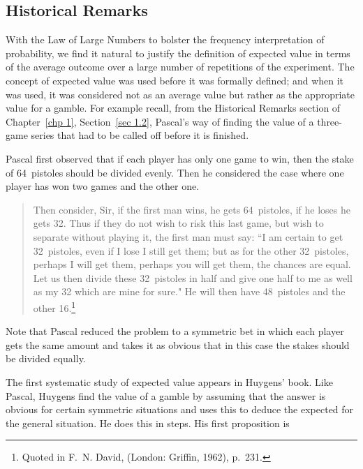 \subsection*{Historical Remarks}

With the Law of Large Numbers to bolster the frequency interpretation of probability, 
we find it natural to justify the definition of expected value in terms of the average
outcome over a large number of repetitions of the experiment.  The concept of expected
value was used before it was formally defined; and when it was used, it was considered
not as an average value but rather as the appropriate value for a gamble.  For example
recall, from the Historical Remarks section of Chapter~\ref{chp 1}, Section~\ref{sec 1.2}, Pascal's way of finding the value of a three-game series that had to be called
off before it is finished.
\par
Pascal first observed that if each player has only one game to win, then the
stake of 64~pistoles should be divided evenly.  Then he considered the case where one
player has won two games and the other one.

\begin{quote} Then consider, Sir, if the first man wins, he gets 64~pistoles, if he
loses he gets 32.  Thus if they do not wish to risk this last game, but wish to
separate without playing it, the first man must say: ``I am certain to get
32~pistoles, even if I lose I still get them; but as for the other 32~pistoles,
perhaps I will get them, perhaps you will get them, the chances are equal.  Let us
then divide these 32~pistoles in half and give one half to me as well as my 32 which
are mine for sure."  He will then have 48~pistoles and the other 16.\footnote{Quoted
in F.~N. David,  (London: Griffin, 1962), p.~231.}
\end{quote}

Note that Pascal reduced the problem to a symmetric bet in which each player gets the
same amount and takes it as obvious that in this case the stakes should be divided
equally.

The first systematic study of expected value appears in Huygens' book. 
Like Pascal, Huygens find the value of a gamble by assuming that the answer is obvious for
certain symmetric situations and uses this to deduce the expected for the general situation. 
He does this in steps.  His first proposition is

